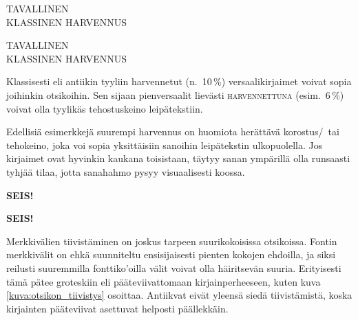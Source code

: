 \begin{koodilohkosis}
\large TAVALLINEN \\
{ KLASSINEN HARVENNUS}
\end{koodilohkosis}

\begin{tulossis}
  \large
  TAVALLINEN \\
  { KLASSINEN HARVENNUS}
\end{tulossis}

Klassisesti eli antiikin tyyliin harvennetut (n.~10\,\%)
versaalikirjaimet voivat sopia joihinkin otsikoihin. Sen sijaan
pienversaalit lievästi {
  \textsc{harvennettuna}} (esim.~6\,\%) voivat olla tyylikäs
tehostuskeino leipätekstiin.

Edellisiä esimerkkejä suurempi harvennus on huomiota herättävä
korostus\-/\ tai tehokeino, joka voi sopia yksittäisiin sanoihin
leipätekstin ulkopuolella. Jos kirjaimet ovat hyvinkin kaukana
toisistaan, täytyy sanan ympärillä olla runsaasti tyhjää tilaa, jotta
sanahahmo pysyy visuaalisesti koossa.

\begin{koodilohkosis}
{\sffamily\bfseries{} SEIS!}
\end{koodilohkosis}

\begin{tulossis}
  {\sffamily\bfseries{} SEIS!}
\end{tulossis}

Merkkivälien tiivistäminen on joskus tarpeen suurikokoisissa otsikoissa.
Fontin merkkivälit on ehkä suunniteltu ensisijaisesti pienten kokojen
ehdoilla, ja siksi reilusti suuremmilla fonttiko'oilla välit voivat olla
häiritsevän suuria. Erityisesti tämä pätee groteskiin eli
pääteviivattomaan kirjainperheeseen, kuten kuva
\ref{kuva:otsikon_tiivistys} osoittaa. Antiikvat eivät yleensä siedä
tiivistämistä, koska kirjainten pääteviivat asettuvat helposti
päällekkäin.


